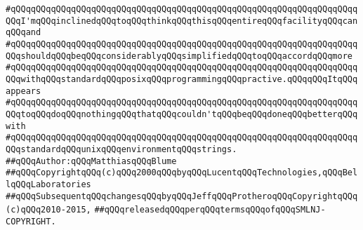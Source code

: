 \verb|#qQQqqQQqqQQqqQQqqQQqqQQqqQQqqQQqqQQqqQQqqQQqqQQqqQQqqQQqqQQqqQQqqQQqqQQqI'mqQQqinclinedqQQqtoqQQqthinkqQQqthisqQQqentireqQQqfacilityqQQqcanqQQqand|\newline
\verb|#qQQqqQQqqQQqqQQqqQQqqQQqqQQqqQQqqQQqqQQqqQQqqQQqqQQqqQQqqQQqqQQqqQQqqQQqshouldqQQqbeqQQqconsiderablyqQQqsimplifiedqQQqtoqQQqaccordqQQqmore|\newline
\verb|#qQQqqQQqqQQqqQQqqQQqqQQqqQQqqQQqqQQqqQQqqQQqqQQqqQQqqQQqqQQqqQQqqQQqqQQqwithqQQqstandardqQQqposixqQQqprogrammingqQQqpractive.qQQqqQQqItqQQqappears|\newline
\verb|#qQQqqQQqqQQqqQQqqQQqqQQqqQQqqQQqqQQqqQQqqQQqqQQqqQQqqQQqqQQqqQQqqQQqqQQqtoqQQqdoqQQqnothingqQQqthatqQQqcouldn'tqQQqbeqQQqdoneqQQqbetterqQQqwith|\newline
\verb|#qQQqqQQqqQQqqQQqqQQqqQQqqQQqqQQqqQQqqQQqqQQqqQQqqQQqqQQqqQQqqQQqqQQqqQQqstandardqQQqunixqQQqenvironmentqQQqstrings.|\newline
\newline
\newline
\verb|##qQQqAuthor:qQQqMatthiasqQQqBlume|\newline
\verb|##qQQqCopyrightqQQq(c)qQQq2000qQQqbyqQQqLucentqQQqTechnologies,qQQqBellqQQqLaboratories|\newline
\verb|##qQQqSubsequentqQQqchangesqQQqbyqQQqJeffqQQqProtheroqQQqCopyrightqQQq(c)qQQq2010-2015,|\newline
\verb|##qQQqreleasedqQQqperqQQqtermsqQQqofqQQqSMLNJ-COPYRIGHT.|\newline
\newline

